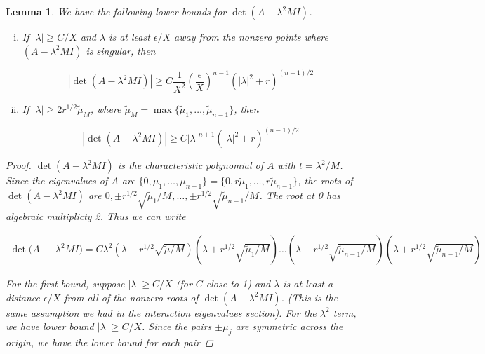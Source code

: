 \documentclass[12pt]{article}
\newtheorem{lemma}{Lemma}
\begin{document}
\begin{lemma}\label{detAboundlemma}
We have the following lower bounds for $\det(A - \lambda^2 M I)$.
\begin{enumerate}[(i)]
\item If $|\lambda| \geq C/X$ and $\lambda$ is at least $\epsilon/X$ away from the nonzero points where $(A - \lambda^2 MI)$ is singular, then

\begin{equation}\label{detAbound1}
|\det(A - \lambda^2 M I)|
\geq C \frac{1}{X^2} \left( \frac{\epsilon}{X} \right)^{n-1} \left( |\lambda|^2 + r \right)^{(n-1)/2}
\end{equation}

\item If $|\lambda| \geq 2 r^{1/2} \tilde{\mu}_M$, where $\tilde{\mu}_M = \max\{\tilde{\mu}_1, \dots, \tilde{\mu}_{n-1} \}$, then

\begin{equation}\label{detAbound2}
|\det(A - \lambda^2 M I)|
\geq C |\lambda|^{n+1} \left( |\lambda|^2 + r \right)^{(n-1)/2}
\end{equation}

\end{enumerate}

\begin{proof}
$\det(A - \lambda^2 MI)$ is the characteristic polynomial of $A$ with $t = \lambda^2 / M$. Since the eigenvalues of $A$ are $\{0, \mu_1, \dots, \mu_{n-1}\} = \{0, r \tilde{\mu}_1, \dots, r\tilde{\mu}_{n-1}\}$, the roots of $\det(A - \lambda^2 MI)$ are $0, \pm r^{1/2} \sqrt{\tilde{\mu}_1/M}, \dots, \pm r^{1/2} \sqrt{\tilde{\mu}_{n-1}/M}$. The root at 0 has algebraic multiplicty 2. Thus we can write

\begin{align*}
\det(A &- \lambda^2 M I) 
= C \lambda^2 (\lambda - r^{1/2} \sqrt{\tilde{\mu}/M} )(\lambda + r^{1/2} \sqrt{\tilde{\mu}_1/M} )
\dots(\lambda - r^{1/2} \sqrt{\tilde{\mu}_{n-1}/M})(\lambda + r^{1/2} \sqrt{\tilde{\mu}_{n-1}/M} )
\end{align*}

For the first bound, suppose $|\lambda| \geq C/X$ (for $C$ close to 1) and $\lambda$ is at least a distance $\epsilon/X$ from all of the nonzero roots of $\det(A - \lambda^2 MI)$. (This is the same assumption we had in the interaction eigenvalues section). For the $\lambda^2$ term, we have lower bound $|\lambda| \geq C/X$. Since the pairs $\pm \mu_j$ are symmetric across the origin, we have the lower bound for each pair


\end{proof}
\end{lemma}
\end{document}
